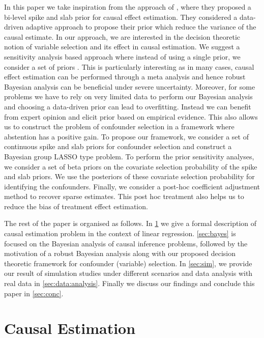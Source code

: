 \documentclass{amsart}
\begin{document}
In this paper we take inspiration from the approach of \citet{koch2020}, where
they proposed a bi-level spike and slab prior for causal effect 
estimation. They considered a data-driven adaptive approach to
propose their prior which reduce the variance of the causal estimate. 
In our approach, we are interested in the decision theoretic notion of 
variable selection and its effect in causal estimation. We suggest a 
sensitivity analysis based approach where instead of using a single prior, 
we consider a set of priors \cite{BERGER1990303}. This is particularly 
interesting as in many cases, causal effect estimation can be performed 
through a meta analysis and hence robust Bayesian analysis can be beneficial
\cite{raices_cruz22} under severe uncertainty. Moreover, for some problems 
we have to rely on very limited data to perform our Bayesian analysis and 
choosing a data-driven prior can lead to overfitting. Instead we can 
benefit from expert opinion and elicit prior based on empirical evidence.
This also allows us to construct the problem of confounder selection 
in a framework where abstention has a positive gain. To propose our 
framework, we consider a set of continuous spike and slab priors 
\cite{ishwaran2005} for confounder selection and construct a Bayesian 
group LASSO \cite{xu2015} type problem. To perform the prior sensitivity 
analyses, we consider a set of beta priors on the covariate selection 
probability of the spike and slab priors. We use the posteriors of these
covariate selection probability for identifying the confounders. Finally, 
we consider a post-hoc coefficient adjustment method \citet{hahn2015}
to recover sparse estimates. This post hoc treatment also helps us to 
reduce the bias of treatment effect estimation. 

The rest of the paper is organised as follows. In \cref{sec:causal}
we give a formal description of causal estimation problem in the
context of linear regression. \cref{sec:bayes} is focused on the
Bayesian analysis of causal inference problems, followed by the
motivation of a robust Bayesian analysis along with our proposed decision 
theoretic framework for confounder (variable) selection. In \cref{sec:sim}, 
we provide our result of simulation studies under different scenarios 
and data analysis with \alert{real data} in \cref{sec:data:analysis}. Finally 
we discuss our findings and conclude this paper in \cref{sec:conc}.

\section{Causal Estimation}\label{sec:causal}
\end{document}
